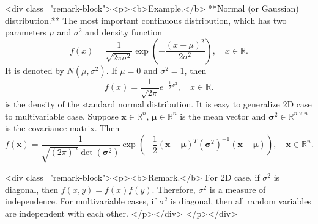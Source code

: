 <div class="remark-block"><p><b>Example.</b> 
**Normal (or Gaussian) distribution.** The most important continuous distribution, which has two parameters $\mu$ and $\sigma^2$ and density function
$$\begin{equation}
    f(x) = \frac{1}{\sqrt{2\pi\sigma^2}} \exp \left( -\frac{(x-\mu)^2}{2\sigma^2} \right), \quad x\in\mathbb{R}. 
\end{equation}$$
It is denoted by $N(\mu, \sigma^2)$. If $\mu=0$ and $\sigma^2=1$, then
$$\begin{equation}
    f(x) = \frac{1}{\sqrt{2\pi}} e^{-\frac{1}{2}x^2}, \quad x\in\mathbb{R}.
\end{equation}$$
is the density of the standard normal distribution. It is easy to generalize 2D case to multivariable case. Suppose $\mathbf{x} \in \mathbb{R}^n$, $\mathbf{\mu} \in \mathbb{R}^n$ is the mean vector and $\mathbf{\sigma}^2 \in \mathbb{R}^{n\times n}$ is the covariance matrix. Then
$$\begin{equation}
    f(\mathbf{x}) = \frac{1}{\sqrt{(2\pi)^n} \det(\mathbf{\sigma}^2)} \exp \left( -\frac{1}{2} (\mathbf{x}-\mathbf{\mu})^T (\mathbf{\sigma}^2)^{-1} (\mathbf{x}-\mathbf{\mu}) \right), \quad \mathbf{x} \in \mathbb{R}^n.
\end{equation}$$

<div class="remark-block"><p><b>Remark.</b> 
For 2D case, if $\sigma^2$ is diagonal, then $f(x,y) = f(x)f(y)$. Therefore, $\sigma^2$ is a measure of independence. For multivariable cases, if $\sigma^2$ is diagonal, then all random variables are independent with each other.
</p></div>
</p></div>


